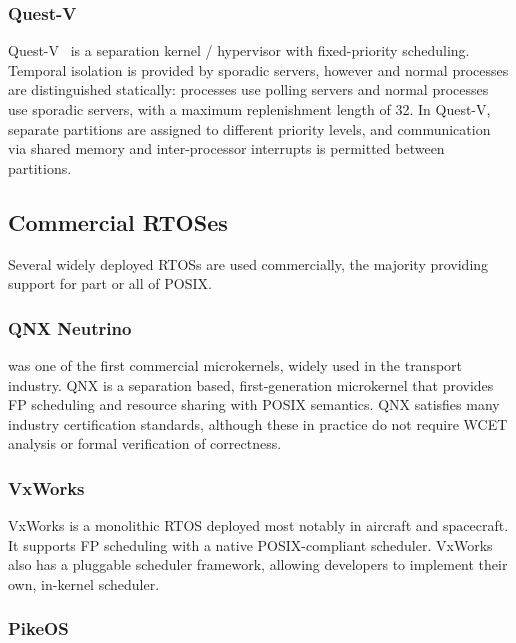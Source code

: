 \subsubsection{Quest-V}

Quest-V~\citep{Danish_LW_11} is a separation kernel / hypervisor with fixed-priority
scheduling.  Temporal isolation is provided by sporadic servers, however \IO and normal processes
are distinguished statically: \IO processes use polling servers and normal processes use sporadic
servers, with a maximum replenishment length of 32. In Quest-V, separate partitions are assigned to
different priority levels, and communication via shared memory and inter-processor interrupts 
is permitted between partitions.

\subsection{Commercial RTOSes}
Several widely deployed \glspl{RTOS} are used commercially, the majority providing support for part or
all of \gls{POSIX}.  

\subsubsection{QNX Neutrino}

\citet{QNX_10} was one of the first commercial microkernels, widely used in the transport industry.
QNX is a separation based, first-generation microkernel that provides
\gls{FP} scheduling and resource sharing with POSIX semantics.  QNX satisfies many industry
certification standards, although these in practice do not require {\gls{WCET}} analysis or formal
verification of correctness.

\subsubsection{VxWorks}

VxWorks\citep{VxWorks_08} is a monolithic \gls{RTOS} deployed most notably in aircraft
and spacecraft.  It supports \gls{FP} scheduling with a native POSIX-compliant scheduler.  VxWorks
also has a pluggable scheduler framework, allowing developers to implement their own, in-kernel
scheduler.

\subsubsection{PikeOS}

